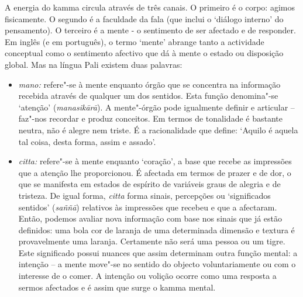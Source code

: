 A energia do kamma circula através de três canais. O primeiro é o corpo: agimos
fisicamente. O segundo é a faculdade da fala (que inclui o `diálogo interno' do
pensamento). O terceiro é a mente - o sentimento de ser afectado e de responder.
Em inglês (e em português), o termo `mente' abrange tanto a actividade
conceptual como o sentimento afectivo que dá à mente o estado ou disposição
global. Mas na língua Pali existem duas palavras:

\enlargethispage{\baselineskip}

\begin{itemize}

  \item \emph{mano:} refere"-se à mente enquanto órgão que se concentra na
        informação recebida através de qualquer um dos sentidos. Esta função
        denomina"-se `atenção' (\emph{manasikārā}). A mente"-órgão pode igualmente
        definir e articular -- faz"-nos recordar e produz conceitos. Em termos de
        tonalidade é bastante neutra, não é alegre nem triste. É a racionalidade
        que define: `Aquilo é aquela tal coisa, desta forma, assim e assado'.

  \item \emph{citta:} refere"-se à mente enquanto `coração', a base que recebe
        as impressões que a atenção lhe proporcionou. É afectada em termos de
        prazer e de dor, o que se manifesta em estados de espírito de variáveis
        graus de alegria e de tristeza. De igual forma, \emph{citta} forma
        sinais, percepções ou `significados sentidos' (\emph{saññā}) relativos
        às impressões que recebeu e que a afectaram. Então, podemos avaliar nova
        informação com base nos sinais que já estão definidos: uma bola cor de
        laranja de uma determinada dimensão e textura é provavelmente uma
        laranja. Certamente não será uma pessoa ou um tigre. Este significado
        possui nuances que assim determinam outra função mental: a intenção -- a
        mente move"-se no sentido do objecto voluntariamente ou com o interesse
        de o comer. A intenção ou volição ocorre como uma resposta a sermos
        afectados e é assim que surge o kamma mental.

\end{itemize}

\enlargethispage{\baselineskip}


